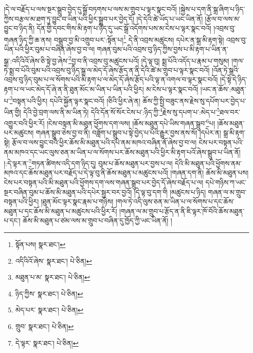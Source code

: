 །དེ་ལ་བརྗོད་པ་ལས་སྔར་སྒྲུབ་བྱེད་དུ་སྒྲོ་བཏགས་པ་ལས་མ་གྲུབ་པ་ལྟར་སྣང་བའོ། །སྐྱེས་པ་དག་ནི་སྒྲ་ཞིག་པ་ཉིད་ཀྱིས་བརྩལ་མ་ཐག་ཏུ་བྱུང་བ་ཡིན་པའི་ཕྱིར་སྒྲུབ་པར་བྱེད་དོ། །དེ་དེའི་ཚེ་ཡོད་པ་ཡང་ཡིན་ནོ། །རྩོལ་བ་ལས་མ་བྱུང་བ་ཉིད་ནི། དོན་གྱི་དབང་གིས་མི་རྟག་པ་ཉིད་དུ་ཡང་སྒྲོ་འདོགས་པས་མ་ངེས་པ་ལྟར་སྣང་བའོ། །འབྲས་བུ་གཞན་ཉིད་ཀྱི་ཆ་ནས། བསྒྲུབ་བྱ་མི་འགྲུབ་པར་:སྟོན་པ།\footnote{སྟོན་པས།  སྣར་ཐང་། } དེ་ནི་འབྲས་མཚུངས། དཔེར་ན་སྒྲ་མི་རྟག་སྟེ། འབྲས་བུ་ཡིན་པའི་ཕྱིར་བུམ་པ་བཞིན་ཞེས་བྱ་བ་ལ། གཞན་བུམ་པའི་འབྲས་བུ་ཉིད་ཀྱིས་བྱས་པ་མི་རྟག་པ་ཡིན་ན་སྒྲ་:འདིའིའོ་ཞེས་ཅི་སྟེ་བྱ་ཞེས་\footnote{འདིའིའོ་ཞེས་  སྣར་ཐང་།  པེ་ཅིན། }བྱ་བ་ནི་འབྲས་བུ་མཚུངས་པའོ། །དེ་ལྟ་བུ། སྨྲ་པོའི་འདོད་པ་རྣམ་པ་གསུམ། །གལ་ཏེ་སྨྲ་བ་པོའི་བུམ་པའི་འབྲས་བུ་ཉིད་སྒྲ་ལ་མེད་དོ་ཞེས་རྩོད་ན་ནི་དེའི་ཚེ་མ་གྲུབ་པ་ལྟར་སྣང་བའོ། །འོན་ཏེ་སྒྲའི་འབྲས་བུ་ཉིད་བུམ་པ་ལ་སོགས་པའི་མི་རྟག་པ་ལ་མེད་དོ་ཞེས་རྩོད་པའི་ལྟ་ན་འགལ་བ་ལྟར་སྣང་བའོ། །དེ་སྟེ་དེ་ཉིད་རྟག་པ་ལ་ཡང་མེད་དོ་ཞེ་ན་ནི་ཐུན་མོང་མ་ཡིན་པ་ཡིན་པའི་ཕྱིར། མ་ངེས་པ་ལྟར་སྣང་བའོ། །ཡང་ན་ཆོས་:མཐུན་པ་\footnote{མཐུན་པ་མ་  སྣར་ཐང་།  པེ་ཅིན། }བསྟན་པའི་ཕྱིར། དཔེའི་སྐྱོན་ལྟར་སྣང་བའོ། །ཅིའི་ཕྱིར་ཞེ་ན། ཆོས་ཀྱི་སྤྱི་བཟུང་ནས་རྗེས་སུ་དཔོག་པར་བྱེད་པ་ཡིན་གྱི། དེའི་བྱེ་བྲག་ལས་ནི་མ་ཡིན་ཏེ། དེའི་དོན་སོ་སོར་ངེས་པ་:ཉིད་ཀྱི་\footnote{ཉིད་ཀྱིས་  སྣར་ཐང་།  པེ་ཅིན། }རྗེས་སུ་དཔག་པ་:མེད་པ་\footnote{མེད་པར་  སྣར་ཐང་།  པེ་ཅིན། }ཐལ་བར་འགྱུར་བའི་ཕྱིར་རོ། །ངེས་བསྟན་མི་མཐུན་ཕྱོགས་དག་ལས། །ཆོས་མཐུན་དཔེ་ཡིས་གཞན་སྒྲུབ་\footnote{གྲུབ་  སྣར་ཐང་།  པེ་ཅིན། }པ། །ཆོས་མཐུན་པར་མཚུངས། གཞན་སྒྲུབ་ཅེས་བྱ་བ་ནི། བཟློག་པ་སྒྲུབ་པ་སྟེ་བྱེད་པ་པོའི་རྒྱུར་བྱས་ནས་སོ། །དཔེར་ན། སྒྲ་མི་རྟག་སྟེ། རྩོལ་བ་ལས་བྱུང་བའི་ཕྱིར་ཆོས་མི་མཐུན་པའི་དཔེ་ནམ་མཁའ་བཞིན་ནོ་ཞེས་བྱ་བ་ལ། ངེས་པར་བསྟན་པའི་ནམ་མཁའ་དང་ཡང་ལུས་ཅན་མ་ཡིན་པ་ལ་སོགས་པར་ཆོས་མཐུན་པའི་ཕྱིར་མི་རྟག་པའོ་ཞེས་སྒྲུབ་པ་ཡིན་ནོ། །:དེ་ལྟར་ན་\footnote{དེ་ལྟར་  སྣར་ཐང་།  པེ་ཅིན། }གཏན་ཚིགས་འདི་དག་ཉིད་དུ། བུམ་པ་ཆོས་མཐུན་པར་བྱས་པ་ལ། དེའི་མི་མཐུན་པའི་ཕྱོགས་ནམ་མཁའ་དང་ཆོས་མཐུན་པར་བརྗོད་པ་དེ་ལྟ་བུ་ནི་ཆོས་མཐུན་པ་མཚུངས་པའོ། །གཞན་དག་ནི། ཆོས་མི་མཐུན་པས། ངེས་པར་བསྟན་པའི་མི་མཐུན་པའི་ཕྱོགས་དག་ལས་གཞན་སྒྲུབ་པར་བྱེད་དོ་ཞེས་བརྗོད་པ་ལ། དཔེ་གཉིས་ཀ་ཡང་སྔར་བཞིན་བུམ་པ་ཆོས་མི་མཐུན་པའི་དཔེར་སྦྱར་བར་བྱའོ། །དེ་ལྟ་བུ་དག་གི །མཚུངས་པ་ཉིད། གཞན་ལ་མ་གྲུབ་བསྟན་པའི་ཕྱིར། །ཐུན་མོང་ལྟར་སྣང་རྣམ་པ་གཉིས། །གལ་ཏེ་འདི་ལུས་ཅན་མ་ཡིན་པ་ལ་སོགས་པ་དང་ཆོས་མཐུན་པ་དང་ཆོས་མི་མཐུན་པ་མཚུངས་པའི་ཕྱིར་རོ། །གཞན་ལ་མ་གྲུབ་པ་རྩོད་ན་ནི་ཇི་ལྟར་ཁོ་བོའི་ཆོས་མཐུན་པ་དང་། ཆོས་མི་མཐུན་པ་ཙམ་ལས་མ་གྲུབ་པ་བཞིན་དུ་ཁྱོད་ཀྱི་ཡང་ཡིན་ནོ། །
